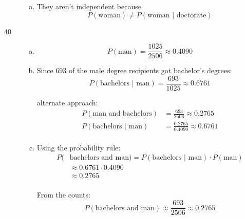 \documentclass[letterpaper, landscape]{exam}
\begin{document}
\begin{description}
\begin{enumerate}[(a)]
        \item They aren't independent because 
          \[
            P(\text {woman}) \neq P( \text{woman } | \text { doctorate} )
          \]

      \end{enumerate}

    \item[40]
      \begin{enumerate}[(a)]
        \item 
          \[
            P(\text{man}) = \frac{1025}{2506} \approx \boxed{ 0.4090 }
          \]

        \item

          Since 693 of the male degree recipients got bachelor's degrees:
          \[
            P( \text{bachelors } | \text { man} ) = \frac{693}{1025} 
              \approx \boxed{ 0.6761 } 
          \]

          alternate approach:
          \begin{align*}
            P( \text{man and bachelors} )         & = \frac{693}{2506} \approx 0.2765 \\
            P( \text{bachelors } | \text { man} ) & = \frac{0.2765}{0.4090}
              \approx 0.6761 \\
          \end{align*}
        \item Using the probability rule:
          \begin{align*}
            P( & \text{bachelors and man}) = 
              P( \text{bachelors } | \text { man} ) \cdot P( \text{man} ) \\
              & \approx 0.6761 \cdot 0.4090  \\
              & \approx \boxed{ 0.2765 }  \\
          \end{align*}

          From the counts:
          \[
            P( \text{bachelors and man}) \approx \frac{693}{2506} \approx 0.2765 
          \]

      \end{enumerate}




\end{description}
\end{document}
